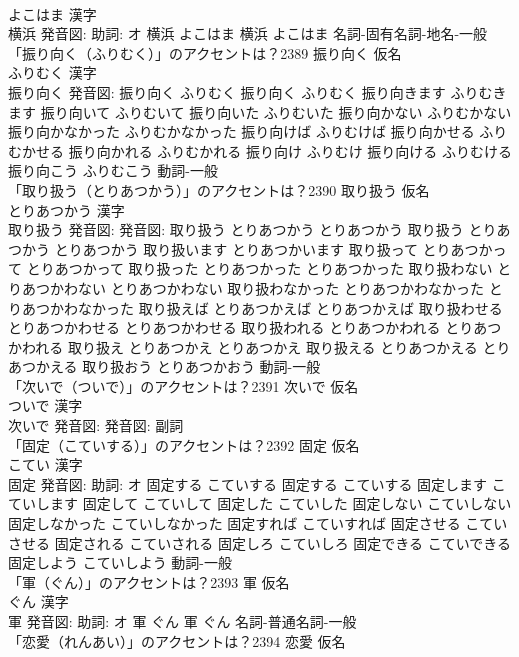\documentclass[8pt]{extreport}
\begin{document}
\begin{CJK}{UTF8}{min}
\\	よこはま 漢字　
\\	横浜 発音図: 助詞: オ	横浜 よこはま		横浜 よこはま				名詞-固有名詞-地名-一般 
\\	「振り向く（ふりむく）」のアクセントは？2389	振り向く 仮名　
\\	ふりむく 漢字　
\\	振り向く 発音図:	振り向く ふりむく		振り向く ふりむく 振り向きます ふりむきます 振り向いて ふりむいて 振り向いた ふりむいた 振り向かない ふりむかない 振り向かなかった ふりむかなかった 振り向けば ふりむけば 振り向かせる ふりむかせる 振り向かれる ふりむかれる 振り向け ふりむけ 振り向ける ふりむける 振り向こう ふりむこう				動詞-一般 
\\	「取り扱う（とりあつかう）」のアクセントは？2390	取り扱う 仮名　
\\	とりあつかう 漢字　
\\	取り扱う 発音図: 発音図:	取り扱う とりあつかう とりあつかう		取り扱う とりあつかう とりあつかう 取り扱います とりあつかいます 取り扱って とりあつかって とりあつかって 取り扱った とりあつかった とりあつかった 取り扱わない とりあつかわない とりあつかわない 取り扱わなかった とりあつかわなかった とりあつかわなかった 取り扱えば とりあつかえば とりあつかえば 取り扱わせる とりあつかわせる とりあつかわせる 取り扱われる とりあつかわれる とりあつかわれる 取り扱え とりあつかえ とりあつかえ 取り扱える とりあつかえる とりあつかえる 取り扱おう とりあつかおう				動詞-一般 
\\	「次いで（ついで）」のアクセントは？2391	次いで 仮名　
\\	ついで 漢字　
\\	次いで 発音図: 発音図:							副詞 
\\	「固定（こていする）」のアクセントは？2392	固定 仮名　
\\	こてい 漢字　
\\	固定 発音図: 助詞: オ	固定する こていする		固定する こていする 固定します こていします 固定して こていして 固定した こていした 固定しない こていしない 固定しなかった こていしなかった 固定すれば こていすれば 固定させる こていさせる 固定される こていされる 固定しろ こていしろ 固定できる こていできる 固定しよう こていしよう				動詞-一般 
\\	「軍（ぐん）」のアクセントは？2393	軍 仮名　
\\	ぐん 漢字　
\\	軍 発音図: 助詞: オ	軍 ぐん		軍 ぐん				名詞-普通名詞-一般 
\\	「恋愛（れんあい）」のアクセントは？2394	恋愛 仮名　

\end{CJK}
\end{document}
